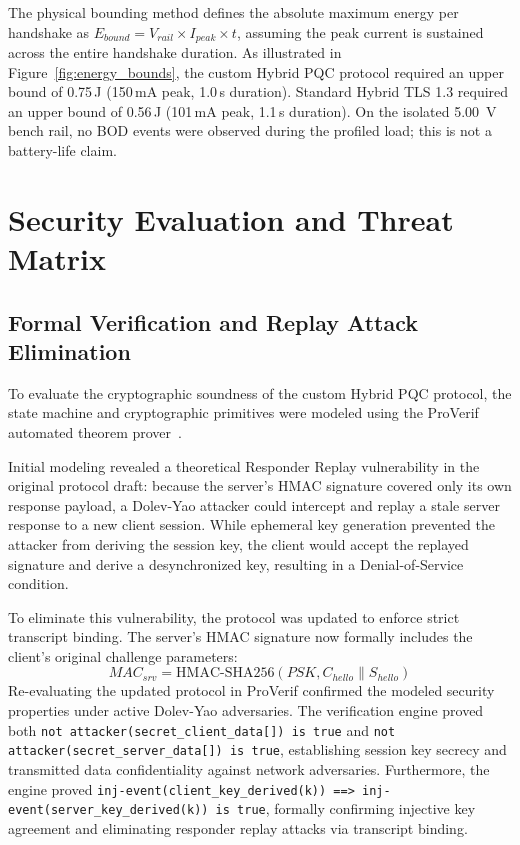 \documentclass[journal, 10pt]{IEEEtran}
\begin{document}
The physical bounding method defines the absolute maximum energy per handshake as $E_{bound} = V_{rail} \times I_{peak} \times t$, assuming the peak current is sustained across the entire handshake duration. As illustrated in Figure~\ref{fig:energy_bounds}, the custom Hybrid PQC protocol required an upper bound of 0.75\,J (150\,mA peak, 1.0\,s duration). Standard Hybrid TLS 1.3 required an upper bound of 0.56\,J (101\,mA peak, 1.1\,s duration). On the isolated 5.00~V bench rail, no BOD events were observed during the profiled load; this is not a battery-life claim.


\section{Security Evaluation and Threat Matrix}

\subsection{Formal Verification and Replay Attack Elimination}
To evaluate the cryptographic soundness of the custom Hybrid PQC protocol, the state machine and cryptographic primitives were modeled using the ProVerif automated theorem prover~\cite{b25}. 

Initial modeling revealed a theoretical Responder Replay vulnerability in the original protocol draft: because the server's HMAC signature covered only its own response payload, a Dolev-Yao attacker could intercept and replay a stale server response to a new client session. While ephemeral key generation prevented the attacker from deriving the session key, the client would accept the replayed signature and derive a desynchronized key, resulting in a Denial-of-Service condition.

To eliminate this vulnerability, the protocol was updated to enforce strict transcript binding. The server's HMAC signature now formally includes the client's original challenge parameters:
\begin{equation}
MAC_{srv} = \text{HMAC-SHA256}(PSK, C_{hello} \parallel S_{hello})
\end{equation}
Re-evaluating the updated protocol in ProVerif confirmed the modeled security properties under active Dolev-Yao adversaries. The verification engine proved both \texttt{not attacker(secret\_client\_data[]) is true} and \texttt{not attacker(secret\_server\_data[]) is true}, establishing session key secrecy and transmitted data confidentiality against network adversaries. Furthermore, the engine proved \texttt{inj-event(client\_key\_derived(k)) ==> inj-event(server\_key\_derived(k)) is true}, formally confirming injective key agreement and eliminating responder replay attacks via transcript binding.
\end{document}
